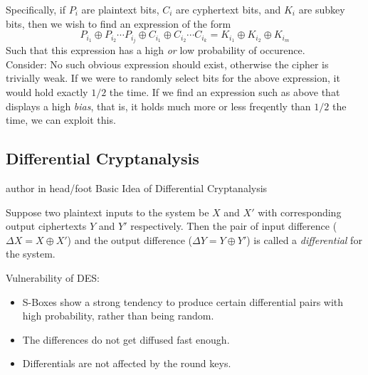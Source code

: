 \documentclass[9pt]{beamer}
\begin{document}
\begin{frame}
Specifically, if $P_{i}$ are plaintext bits, $C_{i}$ are cyphertext bits, and $K_{i}$ are subkey bits, then we wish to find an expression of the form
\[ P_{i_1} \oplus P_{i_2} \cdots P_{i_j} \oplus C_{i_1} \oplus C_{i_2} \cdots C_{i_k} = K_{i_1} \oplus K_{i_2} \oplus K_{i_m} \]
Such that this expression has a high \textit{or} low probability of occurence.\\
\vspace{5mm}
Consider: No such obvious expression should exist, otherwise the cipher is trivially weak. If we were to randomly select bits for the above expression, it would hold exactly $1/2$ the time. If we find an expression such as above that displays a high \textit{bias}, that is, it holds much more or less freqently than $1/2$ the time, we can exploit this.
\end{frame}


\subsection{Differential Cryptanalysis}
\begin{frame}
\begin{beamercolorbox}[ht=2.5ex,dp=1.125ex,center,rounded=true,shadow=true]{author in head/foot}
Basic Idea of Differential Cryptanalysis
\end{beamercolorbox}
\end{frame}

\begin{frame}
\begin{definition}[Differential]
Suppose two plaintext inputs to the system be $X$ and $X'$ with corresponding output ciphertexts $Y$ and $Y'$ respectively. Then the pair of input difference ($\Delta X = X \oplus X'$) and the output difference ($\Delta Y = Y \oplus Y'$) is called a {\it differential} for the system.
\end{definition}

Vulnerability of DES:\\
\begin{itemize}
\item{S-Boxes show a strong tendency to produce certain differential pairs with high probability, rather than being random.}
\item{The differences do not get diffused fast enough.}
\item{Differentials are not affected by the round keys.}
\end{itemize}
\end{frame}
\end{document}
